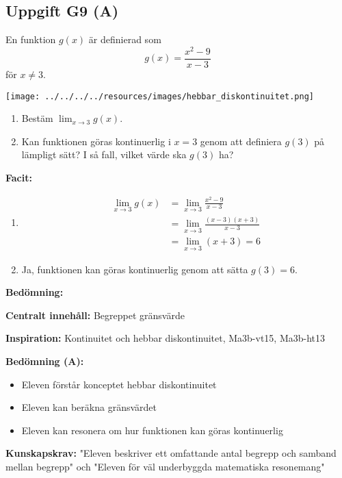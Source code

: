 \documentclass[12pt]{article}
\begin{document}
\subsection*{Uppgift G9 (A)}
En funktion $g(x)$ är definierad som
\[
g(x) = \frac{x^2 - 9}{x - 3}
\]
för $x \neq 3$.

\begin{center}
\texttt{[image: ../../../../resources/images/hebbar\_diskontinuitet.png]}
\end{center}

\begin{enumerate}[label=\alph*)]
    \item Bestäm $\lim_{x \to 3} g(x)$.
    \item Kan funktionen göras kontinuerlig i $x = 3$ genom att definiera $g(3)$ på lämpligt sätt? I så fall, vilket värde ska $g(3)$ ha?
\end{enumerate}

\begin{facitbox}
\textbf{Facit:}

\begin{enumerate}[label=\alph*)]
    \item 
    \begin{align*}
    \lim_{x \to 3} g(x) &= \lim_{x \to 3} \frac{x^2 - 9}{x - 3} \\
    &= \lim_{x \to 3} \frac{(x - 3)(x + 3)}{x - 3} \\
    &= \lim_{x \to 3} (x + 3) = 6
    \end{align*}
    \item Ja, funktionen kan göras kontinuerlig genom att sätta $g(3) = 6$.
\end{enumerate}
\end{facitbox}

\begin{refbox}
\textbf{Bedömning:}

\textbf{Centralt innehåll:} Begreppet gränsvärde

\textbf{Inspiration:} Kontinuitet och hebbar diskontinuitet, Ma3b-vt15, Ma3b-ht13

\textbf{Bedömning (A):}
\begin{itemize}
    \item Eleven förstår konceptet hebbar diskontinuitet
    \item Eleven kan beräkna gränsvärdet
    \item Eleven kan resonera om hur funktionen kan göras kontinuerlig
\end{itemize}

\textbf{Kunskapskrav:} "Eleven beskriver ett omfattande antal begrepp och samband mellan begrepp" och "Eleven för väl underbyggda matematiska resonemang"
\end{refbox}
\end{document}
